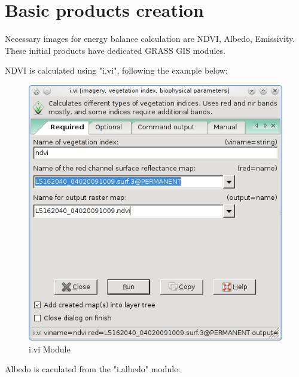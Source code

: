 \section{Basic products creation}

Necessary images for energy balance calculation are NDVI, Albedo, Emissivity. These initial products have dedicated GRASS GIS modules.\newline

NDVI is calculated using "i.vi", following the example below:\newline

\begin{figure}[htbp]
   \centering
   \includegraphics[scale=0.4]{gipe017.png}
   \caption{i.vi Module}
   \label{fig:gipe017}
\end{figure}

Albedo is caculated from the "i.albedo" module:\newline

